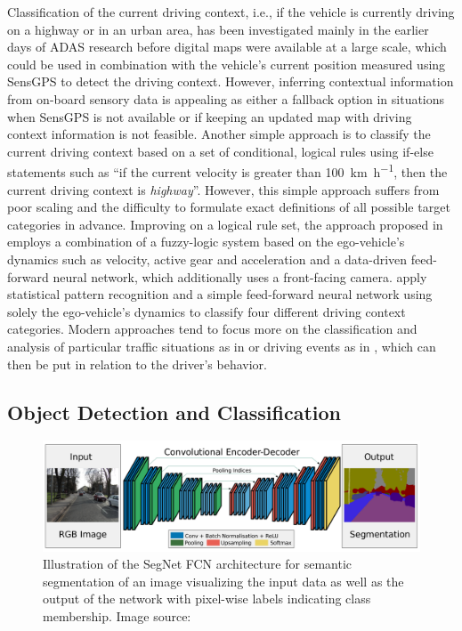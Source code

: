 Classification of the current driving context, i.e., if the vehicle is currently driving on a highway or in an urban area, has been investigated mainly in the earlier days of \ac{ADAS} research before digital maps were available at a large scale, which could be used in combination with the vehicle's current position measured using \ac{SensGPS} to detect the driving context.
However, inferring contextual information from on-board sensory data is appealing as either a fallback option in situations when \ac{SensGPS} is not available or if keeping an updated map with driving context information is not feasible.
Another simple approach is to classify the current driving context based on a set of conditional, logical rules using if-else statements such as \enquote{if the current velocity is greater than \SI[per-mode=symbol]{100}{\kilo\meter\per\hour}, then the current driving context is \emph{highway}}.
However, this simple approach suffers from poor scaling and the difficulty to formulate exact definitions of all possible target categories in advance.
Improving on a logical rule set, the approach proposed in \textcite{Hauptmann1996} employs a combination of a fuzzy-logic system based on the ego-vehicle's dynamics such as velocity, active gear and acceleration and a data-driven feed-forward neural network, which additionally uses a front-facing camera.
\textcite{Engstrom2001} apply statistical pattern recognition and a simple feed-forward neural network using solely the ego-vehicle's dynamics to classify four different driving context categories.
Modern approaches tend to focus more on the classification and analysis of particular traffic situations  as in \textcite{Hermann2008} or driving events as in \textcite{Dagostino2013}, which can then be put in relation to the driver's behavior.

\subsection{Object Detection and Classification}
\label{subsec:obj_detect}

\begin{figure}[t!]
    \centering
    \includegraphics[width=0.95\linewidth]{imgs/segnet.png}
    \caption{Illustration of the SegNet \acf{FCN} architecture for semantic segmentation of an image visualizing the input data as well as the output of the network with pixel-wise labels indicating class membership. Image source: \textcite{Badrinarayanan2015}}
    \label{fig:segnet_achitecture}
\end{figure}

